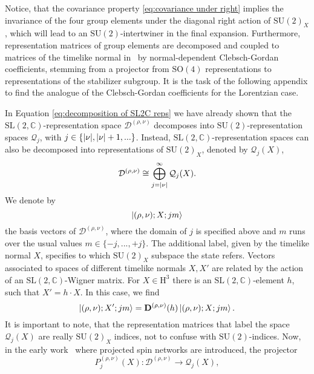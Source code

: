\documentclass[11pt,a4paper]{article}
\newcommand{\C}{\mathbb C}
\newcommand{\SU}{\text{SU$(2)$}}
\newcommand{\SL}{\text{SL$(2,\C)$}}
\newcommand{\HH}{\text{H}^3}
\begin{document}
Notice, that the covariance property \eqref{eq:covariance under right} implies the invariance of the four group elements under the diagonal right action of $\SU_X$, which will lead to an $\SU$-intertwiner in the final expansion. Furthermore, representation matrices of group elements are decomposed and coupled to matrices of the timelike normal in~\cite{Baratin:2011tx} by normal-dependent Clebsch-Gordan coefficients, stemming from a projector from $\text{SO}(4)$ representations to representations of the stabilizer subgroup. It is the task of the following appendix to find the analogue of the Clebsch-Gordan coefficients for the Lorentzian case. 

In Equation \eqref{eq:decomposition of SL2C reps} we have already shown that the $\SL$-representation space $\mathcal{D}^{(\rho,\nu)}$ decomposes into $\SU$-representation spaces $\mathcal{Q}_j$, with $j\in\{\abs{\nu},\abs{\nu}+1,...\}$. Instead, $\SL$-representation spaces can also be decomposed into representations of $\SU_{X}$, denoted by $\mathcal{Q}_j(X)$,
%
\begin{equation}
\mathcal{D}^{(\rho,\nu)}
\cong\bigoplus_{j=\abs{\nu}}^{\infty}\mathcal{Q}_j(X).
\end{equation} 
%
We denote by 
%
\begin{equation}
\ket{(\rho,\nu);X;jm}
\end{equation}
%
the basis vectors of $\mathcal{D}^{(\rho,\nu)}$, where the domain of $j$ is specified above and $m$ runs over the usual values $m\in\{-j,...,+j\}$. The additional label, given by the timelike normal $X$, specifies to which $\SU_X$ subspace the state refers. Vectors associated to spaces of different timelike normals $X,X'$ are related by the action of an $\SL$-Wigner matrix. For $X\in\HH$ there is an $\SL$-element $h$, such that $X' = h\cdot X$. In this case, we find~\cite{Livine:2002ak}
%
\begin{equation}\label{eq:relation of vectors of different normals}
\ket{(\rho,\nu);X';jm}
=
\mathbf{D}^{(\rho,\nu)}(h)\ket{(\rho,\nu);X;jm}.
\end{equation} 
%
It is important to note, that the representation matrices that label the space $\mathcal{Q}_j(X)$ are really $\SU_X$ indices, not to confuse with $\SU$-indices. Now, in the early work~\cite{Livine:2002ak} where projected spin networks are introduced, the projector
%
\begin{equation}
P_j^{(\rho,\nu)}(X): \mathcal{D}^{(\rho,\nu)}  \longrightarrow \mathcal{Q}_j(X),
\end{equation}
\end{document}
